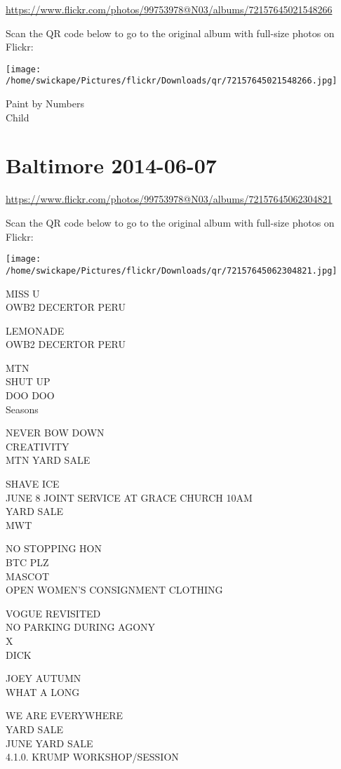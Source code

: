 \documentclass[10pt,letterpaper]{article}
\begin{document}
\url{https://www.flickr.com/photos/99753978@N03/albums/72157645021548266}

Scan the QR code below to go to the original album with full-size photos on Flickr:

\texttt{[image: /home/swickape/Pictures/flickr/Downloads/qr/72157645021548266.jpg]}


Paint by Numbers\\
Child


\section*{Baltimore 2014-06-07}

\url{https://www.flickr.com/photos/99753978@N03/albums/72157645062304821}

Scan the QR code below to go to the original album with full-size photos on Flickr:

\texttt{[image: /home/swickape/Pictures/flickr/Downloads/qr/72157645062304821.jpg]}


MISS U\\
OWB2 DECERTOR PERU

LEMONADE\\
OWB2 DECERTOR PERU

MTN\\
SHUT UP\\
DOO DOO\\
Seasons

NEVER BOW DOWN\\
CREATIVITY\\
MTN YARD SALE

SHAVE ICE\\
JUNE 8 JOINT SERVICE AT GRACE CHURCH 10AM\\
YARD SALE\\
MWT

NO STOPPING HON\\
BTC PLZ\\
MASCOT\\
OPEN WOMEN'S CONSIGNMENT CLOTHING

VOGUE REVISITED\\
NO PARKING DURING AGONY\\
X\\
DICK

JOEY AUTUMN\\
WHAT A LONG

WE ARE EVERYWHERE\\
YARD SALE\\
JUNE YARD SALE\\
4.1.0. KRUMP WORKSHOP/SESSION
\end{document}

